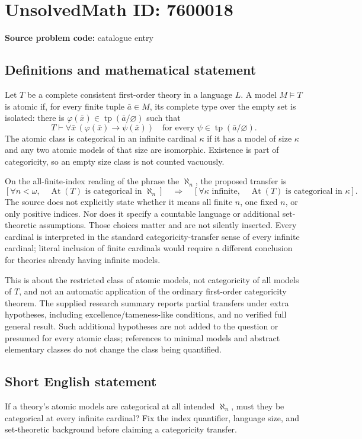 \documentclass[11pt]{article}
\begin{document}
\section*{UnsolvedMath ID: 7600018}
\textbf{Source problem code:} catalogue entry
\subsection{Definitions and mathematical statement}
Let \(T\) be a complete consistent first-order theory in a language \(L\). A model \(M\models T\) is atomic if, for every finite tuple \(\bar a\in M\), its complete type over the empty set is isolated: there is \(\varphi(\bar x)\in\operatorname{tp}(\bar a/\varnothing)\) such that
\[
T\vdash\forall\bar x\,(\varphi(\bar x)\to\psi(\bar x))
\quad\text{for every }\psi\in\operatorname{tp}(\bar a/\varnothing).
\]
The atomic class is categorical in an infinite cardinal \(\kappa\) if it has a model of size \(\kappa\) and any two atomic models of that size are isomorphic. Existence is part of categoricity, so an empty size class is not counted vacuously.

On the all-finite-index reading of the phrase the \(\aleph_n\), the proposed transfer is
\[
\left[\forall n<\omega,\quad\operatorname{At}(T)
\text{ is categorical in }\aleph_n\right]
\quad\Longrightarrow\quad
\left[\forall\kappa\text{ infinite},\quad\operatorname{At}(T)
\text{ is categorical in }\kappa\right].
\]
The source does not explicitly state whether it means all finite \(n\), one fixed \(n\), or only positive indices. Nor does it specify a countable language or additional set-theoretic assumptions. Those choices matter and are not silently inserted. Every cardinal is interpreted in the standard categoricity-transfer sense of every infinite cardinal; literal inclusion of finite cardinals would require a different conclusion for theories already having infinite models.

This is about the restricted class of atomic models, not categoricity of all models of \(T\), and not an automatic application of the ordinary first-order categoricity theorem. The supplied research summary reports partial transfers under extra hypotheses, including excellence/tameness-like conditions, and no verified full general result. Such additional hypotheses are not added to the question or presumed for every atomic class; references to minimal models and abstract elementary classes do not change the class being quantified.
\subsection{Short English statement}
If a theory's atomic models are categorical at all intended \(\aleph_n\), must they be categorical at every infinite cardinal? Fix the index quantifier, language size, and set-theoretic background before claiming a categoricity transfer.
\end{document}
